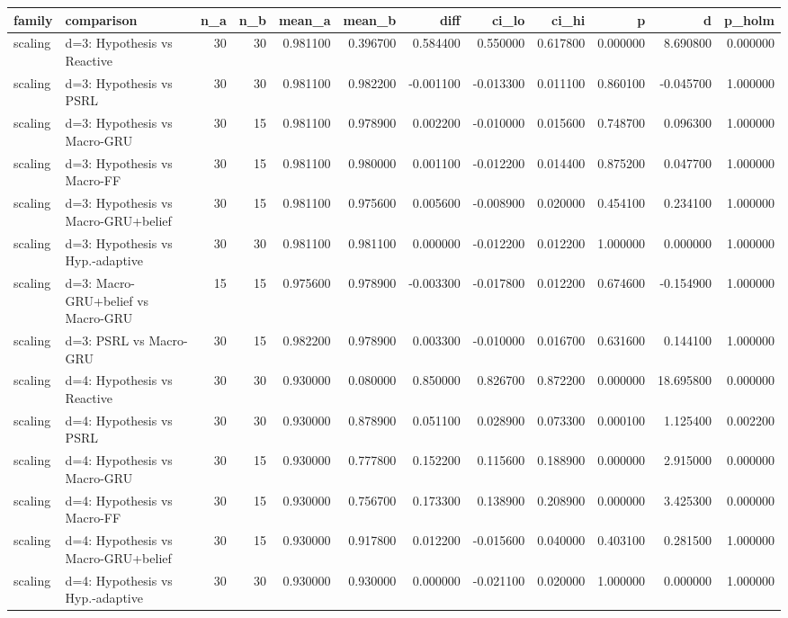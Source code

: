 \begin{tabular}{llrrrrrrrrrr}
\toprule
family & comparison & n\_a & n\_b & mean\_a & mean\_b & diff & ci\_lo & ci\_hi & p & d & p\_holm \\
\midrule
scaling & d=3: Hypothesis vs Reactive & 30 & 30 & 0.981100 & 0.396700 & 0.584400 & 0.550000 & 0.617800 & 0.000000 & 8.690800 & 0.000000 \\
scaling & d=3: Hypothesis vs PSRL & 30 & 30 & 0.981100 & 0.982200 & -0.001100 & -0.013300 & 0.011100 & 0.860100 & -0.045700 & 1.000000 \\
scaling & d=3: Hypothesis vs Macro-GRU & 30 & 15 & 0.981100 & 0.978900 & 0.002200 & -0.010000 & 0.015600 & 0.748700 & 0.096300 & 1.000000 \\
scaling & d=3: Hypothesis vs Macro-FF & 30 & 15 & 0.981100 & 0.980000 & 0.001100 & -0.012200 & 0.014400 & 0.875200 & 0.047700 & 1.000000 \\
scaling & d=3: Hypothesis vs Macro-GRU+belief & 30 & 15 & 0.981100 & 0.975600 & 0.005600 & -0.008900 & 0.020000 & 0.454100 & 0.234100 & 1.000000 \\
scaling & d=3: Hypothesis vs Hyp.-adaptive & 30 & 30 & 0.981100 & 0.981100 & 0.000000 & -0.012200 & 0.012200 & 1.000000 & 0.000000 & 1.000000 \\
scaling & d=3: Macro-GRU+belief vs Macro-GRU & 15 & 15 & 0.975600 & 0.978900 & -0.003300 & -0.017800 & 0.012200 & 0.674600 & -0.154900 & 1.000000 \\
scaling & d=3: PSRL vs Macro-GRU & 30 & 15 & 0.982200 & 0.978900 & 0.003300 & -0.010000 & 0.016700 & 0.631600 & 0.144100 & 1.000000 \\
scaling & d=4: Hypothesis vs Reactive & 30 & 30 & 0.930000 & 0.080000 & 0.850000 & 0.826700 & 0.872200 & 0.000000 & 18.695800 & 0.000000 \\
scaling & d=4: Hypothesis vs PSRL & 30 & 30 & 0.930000 & 0.878900 & 0.051100 & 0.028900 & 0.073300 & 0.000100 & 1.125400 & 0.002200 \\
scaling & d=4: Hypothesis vs Macro-GRU & 30 & 15 & 0.930000 & 0.777800 & 0.152200 & 0.115600 & 0.188900 & 0.000000 & 2.915000 & 0.000000 \\
scaling & d=4: Hypothesis vs Macro-FF & 30 & 15 & 0.930000 & 0.756700 & 0.173300 & 0.138900 & 0.208900 & 0.000000 & 3.425300 & 0.000000 \\
scaling & d=4: Hypothesis vs Macro-GRU+belief & 30 & 15 & 0.930000 & 0.917800 & 0.012200 & -0.015600 & 0.040000 & 0.403100 & 0.281500 & 1.000000 \\
scaling & d=4: Hypothesis vs Hyp.-adaptive & 30 & 30 & 0.930000 & 0.930000 & 0.000000 & -0.021100 & 0.020000 & 1.000000 & 0.000000 & 1.000000 \\

\end{tabular}
